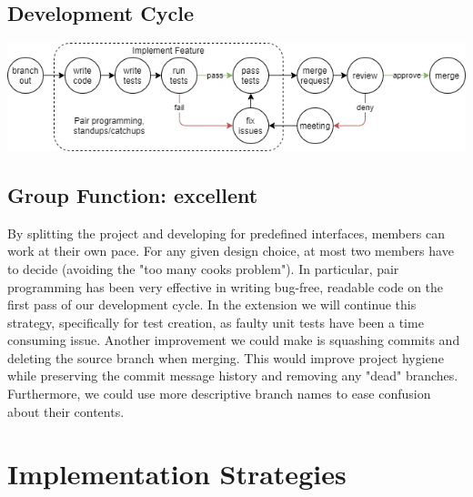 \documentclass[11pt]{article}
\begin{document}
    \subsection*{Development Cycle}
        \begin{center}
            \includegraphics[width = \textwidth]{development cycle}
        \end{center}
    \subsection*{Group Function: \textcolor{OliveGreen}{excellent}}
        By splitting the project and developing for predefined interfaces, members can work at their own pace. For any given design choice, at most two members have to decide (avoiding the "too many cooks problem").
        \newline\newline
        In particular, pair programming has been very effective in writing bug-free, readable code on the first pass of our development cycle. In the extension we will continue this strategy, specifically for test creation, as faulty unit tests have been a time consuming issue. 
        \newline\newline
        Another improvement we could make is squashing commits and deleting the source branch when merging. This would improve project hygiene while preserving the commit message history and removing any "dead" branches. Furthermore, we could use more descriptive branch names to ease confusion about their contents.

\section{Implementation Strategies}
\end{document}
